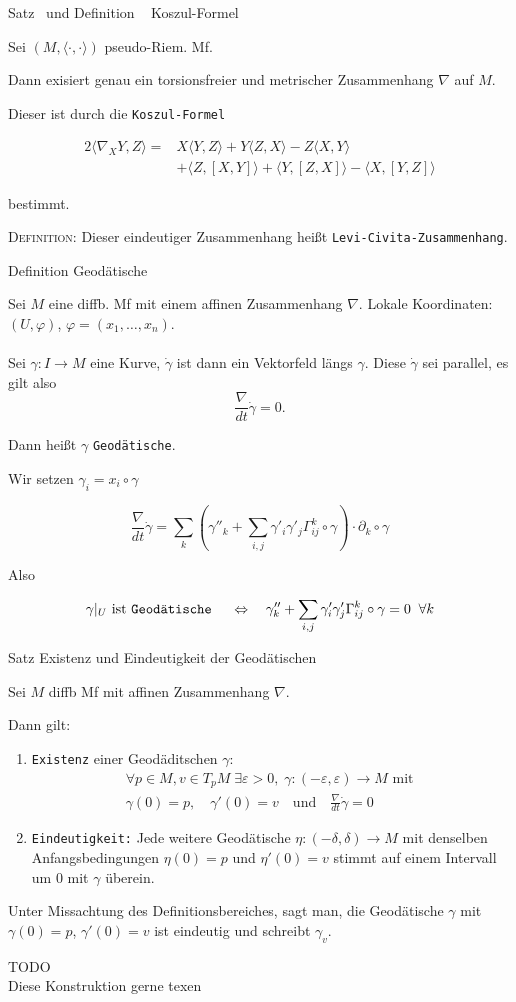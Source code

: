 \documentclass[a6paper,11pt,grid=front]{kartei}
\newcommand{\fl}[1]{\begin{flushleft}
 #1 \end{flushleft}}
\renewcommand{\epsilon}{\varepsilon}
\newcommand{\blf}[1]{\langle #1 \rangle}
\newcounter{def}
\newcounter{satz}
\newcommand{\thisdef}{\thedef\ \stepcounter{def}}
\newcommand{\thissatz}{\thesatz\ \stepcounter{satz}}
\begin{document}
\newcommand{\dg}[3]{#1\blf{#2,#3}}
\newcommand{\blfL}[3]{\blf{#1,[#2,#3]}}
\nonameyet
{Satz \thissatz und Definition \thisdef} {Koszul-Formel}
{
Sei $(M,\blf{\cdot,\cdot})$ pseudo-Riem. Mf.
\fl{Dann exisiert genau ein torsionsfreier und metrischer Zusammenhang $\nabla$
auf $M$.}
\fl{Dieser ist durch die \texttt{Koszul-Formel}}
\[
\begin{aligned}
2\blf{\nabla_X Y, Z} =& 
\dg{X}{Y}{Z} + \dg{Y}{Z}{X} - \dg{Z}{X}{Y}
\\&
+ \blfL{Z}{X}{Y} + \blfL{Y}{Z}{X} - \blfL{X}{Y}{Z}
\end{aligned}
\]
\fl{bestimmt.}
\fl{\textsc{Definition:} Dieser eindeutiger Zusammenhang heißt 
\texttt{Levi-Civita-Zusammenhang}.}
}
{}

\nonameyet
{Definition} {Geodätische}
{
\scriptsize
Sei $M$ eine diffb. Mf mit einem affinen Zusammenhang $\nabla$.
Lokale Koordinaten: $(U,\varphi)$, $\varphi = (x_1,\dots,x_n)$.
%
\\
~\\
\small
Sei $\gamma : I \to M$ eine Kurve, $\dot \gamma $ ist dann ein Vektorfeld
längs $\gamma$. Diese $\dot \gamma$ sei parallel, es gilt also
\[
\frac{\nabla}{dt} \dot\gamma = 0.
\]
\fl{Dann heißt $\gamma$ \texttt{Geodätische}.}
\footnotesize
\fl{Wir setzen $\gamma_i = x_i \circ \gamma$}
\[
\frac{\nabla}{dt} \dot \gamma 
= \sum_k \left( 
\gamma''_k + \sum_{i,j} \gamma'_i \gamma'_j \Gamma^k_{ij}\circ \gamma
\right) 
\cdot \partial_k \circ \gamma
\]
\fl{Also}
\[
\gamma|_U \text{ ist \texttt{Geodätische} }
\quad \Leftrightarrow \quad
\gamma''_k + \sum_{i,j} \gamma'_i \gamma'_j \Gamma^k_{ij}\circ \gamma = 0
\;\; \forall k
\]
}
{}

\nonameyet
{Satz} {\tiny Existenz und Eindeutigkeit der Geodätischen}
{
\small
Sei $M$ diffb Mf mit affinen Zusammenhang $\nabla$. 
\fl{Dann gilt:}
\begin{enumerate}[1.]
\item \texttt{Existenz} einer Geodäditschen $\gamma$: 
\vspace{-0.7em}
\[
\begin{aligned}
\forall p\in M, v\in T_pM \; \exists \epsilon > 0, \;
\gamma:(-\epsilon,\epsilon) \to M \text{ mit } 
\\ 
\gamma(0) = p, 
\quad 
\gamma'(0) = v 
\quad \text{und} \quad 
\frac{\nabla}{dt} \dot \gamma = 0
\end{aligned}
\]
%
\item \texttt{Eindeutigkeit:} Jede weitere Geodätische 
$\eta: (-\delta,\delta) \to M$ mit denselben Anfangsbedingungen
$\eta(0) = p$ und $\eta'(0) = v$ stimmt auf einem Intervall um $0$
mit $\gamma$ überein.
\end{enumerate}
%
\scriptsize
Unter Missachtung des Definitionsbereiches, sagt man, die Geodätische 
$\gamma$ mit $\gamma(0) = p$, $\gamma'(0) = v$ ist eindeutig und schreibt
$\gamma_v$.
\\
}
{
	TODO 
	\\
	Diese Konstruktion gerne texen
}
\end{document}
